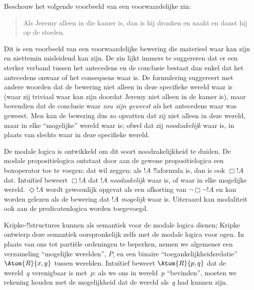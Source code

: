 \documentclass[../../../include/open-logic-section]{subfiles}
\begin{document}


Beschouw het volgende voorbeeld van een voorwaardelijke zin:
\begin{quote}
  Als Jeremy alleen in die kamer is, dan is hij dronken en naakt en
  danst hij op de stoelen.
\end{quote}
Dit is een voorbeeld van een voorwaardelijke bewering die materieel waar kan
zijn en niettemin misleidend kan zijn. De zin lijkt immers te suggereren dat er
een sterker verband tussen het antecedens en de conclusie bestaat dan enkel dat
het antecedens onwaar of het consequens waar is. De formulering suggereert met
andere woorden dat de bewering niet alleen in deze specifieke wereld waar is
(waar zij triviaal waar kan zijn doordat Jeremy niet alleen in de kamer is),
maar bovendien dat de conclusie waar \emph{zou zijn geweest} \emph{als} het
antecedens waar was geweest. Men kan de bewering dus zo opvatten dat zij niet
alleen in deze wereld, maar in elke ``mogelijke'' wereld waar is; ofwel dat zij
\emph{noodzakelijk} waar is, in plaats van slechts waar in deze specifieke
wereld.

De modale logica is ontwikkeld om dit soort noodzakelijkheid te duiden. De
modale propositielogica ontstaat door aan de gewone propositielogica een
boxoperator toe te voegen; dat wil zeggen: als $!A$ !!a{formula} is, dan is ook
$\Box !A$ dat. Intuïtief beweert $\Box !A$ dat $!A$ \emph{noodzakelijk} waar is,
of waar in elke mogelijke wereld. $\Diamond !A$ wordt gewoonlijk opgevat als
een afkorting van $\lnot \Box \lnot !A$ en kan worden gelezen als de bewering
dat $!A$ \emph{mogelijk} waar is. Uiteraard kan modaliteit ook aan de
predicatenlogica worden toegevoegd.

Kripke-!!{structure}s kunnen als semantiek voor de modale logica dienen; Kripke
ontwierp deze semantiek oorspronkelijk zelfs met de modale logica voor ogen. In
plaats van ons tot partiële ordeningen te beperken, nemen we algemener een
verzameling ``mogelijke werelden'', $P$, en een binaire
``toegankelijkheidsrelatie'' $\Atom{R}{x,y}$ tussen werelden. Intuïtief beweert
$\Atom{R}{p,q}$ dat de wereld~$q$ verenigbaar is met~$p$: als we ons in
wereld~$p$ ``bevinden'', moeten we rekening houden met de mogelijkheid dat de
wereld als~$q$ had kunnen zijn.
\end{document}

